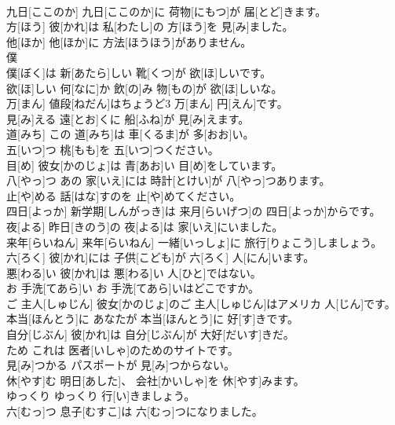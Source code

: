 \documentclass[8pt]{extreport}
\begin{document}
\begin{CJK}{UTF8}{min}
\\	九日[ここのか]	九日[ここのか]に 荷物[にもつ]が 届[とど]きます。		
\\	方[ほう]	彼[かれ]は 私[わたし]の 方[ほう]を 見[み]ました。		
\\	他[ほか]	他[ほか]に 方法[ほうほう]がありません。		
\\	僕
\\	[ぼく]	僕[ぼく]は 新[あたら]しい 靴[くつ]が 欲[ほ]しいです。		
\\	欲[ほ]しい	何[なに]か 飲[の]み 物[もの]が 欲[ほ]しいな。		
\\	万[まん]	値段[ねだん]はちょうど3 万[まん] 円[えん]です。		
\\	見[み]える	遠[とお]くに 船[ふね]が 見[み]えます。		
\\	道[みち]	この 道[みち]は 車[くるま]が 多[おお]い。		
\\	五[いつ]つ	桃[もも]を 五[いつ]つください。		
\\	目[め]	彼女[かのじょ]は 青[あお]い 目[め]をしています。		
\\	八[やっ]つ	あの 家[いえ]には 時計[とけい]が 八[やっ]つあります。		
\\	止[や]める	話[はな]すのを 止[や]めてください。		
\\	四日[よっか]	新学期[しんがっき]は 来月[らいげつ]の 四日[よっか]からです。		
\\	夜[よる]	昨日[きのう]の 夜[よる]は 家[いえ]にいました。		
\\	来年[らいねん]	来年[らいねん] 一緒[いっしょ]に 旅行[りょこう]しましょう。		
\\	六[ろく]	彼[かれ]には 子供[こども]が 六[ろく] 人[にん]います。		
\\	悪[わる]い	彼[かれ]は 悪[わる]い 人[ひと]ではない。		
\\	お 手洗[てあら]い	お 手洗[てあら]いはどこですか。		
\\	ご 主人[しゅじん]	彼女[かのじょ]のご 主人[しゅじん]はアメリカ 人[じん]です。		
\\	本当[ほんとう]に	あなたが 本当[ほんとう]に 好[す]きです。		
\\	自分[じぶん]	彼[かれ]は 自分[じぶん]が 大好[だいす]きだ。		
\\	ため	これは 医者[いしゃ]のためのサイトです。		
\\	見[み]つかる	パスポートが 見[み]つからない。		
\\	休[やす]む	明日[あした]、 会社[かいしゃ]を 休[やす]みます。		
\\	ゆっくり	ゆっくり 行[い]きましょう。		
\\	六[むっ]つ	息子[むすこ]は 六[むっ]つになりました。		

\end{CJK}
\end{document}
